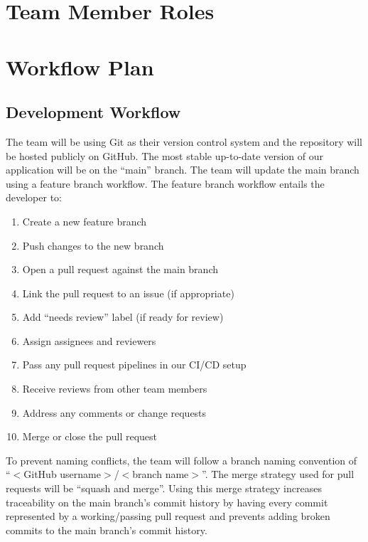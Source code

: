 \documentclass{article}
\begin{document}
\section{Team Member Roles}

\section{Workflow Plan}


\subsection{Development Workflow}

The team will be using Git as their version control system and the repository will be hosted
publicly on GitHub. The most stable up-to-date version of our application will be on the ``main''
branch. The team will update the main branch using a feature branch workflow. The feature branch
workflow entails the developer to:

\begin{enumerate}
  \item Create a new feature branch
  \item Push changes to the new branch
  \item Open a pull request against the main branch
  \item Link the pull request to an issue (if appropriate)
  \item Add ``needs review'' label (if ready for review)
  \item Assign assignees and reviewers
  \item Pass any pull request pipelines in our CI/CD setup
  \item Receive reviews from other team members
  \item Address any comments or change requests
  \item Merge or close the pull request
\end{enumerate}

To prevent naming conflicts, the team will follow a branch naming convention of
``$<$GitHub username$>$/$<$branch name$>$''. The merge strategy used for pull requests will be
``squash and merge''. Using this merge strategy increases traceability on the main branch's commit
history by having every commit represented by a working/passing pull request and prevents adding
broken commits to the main branch's commit history.
\end{document}
